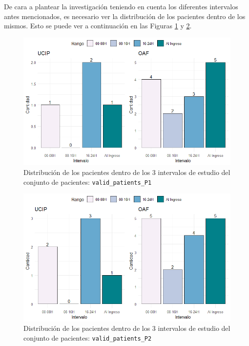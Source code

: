 De cara a plantear la investigación teniendo en cuenta los diferentes intervalos antes mencionados, es necesario ver la distribución de los pacientes dentro de los mismos. Esto se puede ver a continuación en las Figuras \ref{fig:intervalos-valid-1} y \ref{fig:intervalos-valid-2}.

\begin{figure}[H]
    \centering
    \includegraphics[scale = 0.9]{./img/intervalos-valid-1.png}
    \caption{Distribución de los pacientes dentro de los $3$ intervalos de estudio del conjunto de pacientes: \texttt{valid\_patients\_P1}}
    \label{fig:intervalos-valid-1}
\end{figure}

\begin{figure}[H]
    \centering
    \includegraphics[scale = 0.9]{./img/intervalos-valid-2.png}
    \caption{Distribución de los pacientes dentro de los $3$ intervalos de estudio del conjunto de pacientes: \texttt{valid\_patients\_P2}}
    \label{fig:intervalos-valid-2}
\end{figure}

